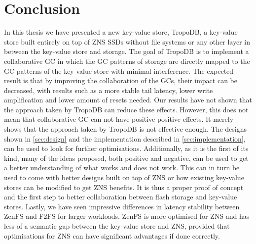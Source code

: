\chapter{Conclusion}
\label{sec:conclusion}
In this thesis we have presented a new key-value store, TropoDB, a key-value store built entirely on top of ZNS SSDs without file systems or any other layer in between the key-value store and storage. The goal of TropoDB is to implement a collaborative GC in which the GC patterns of storage are directly mapped to the GC patterns of the key-value store with minimal interference. The expected result is that by improving the collaboration of the GCs, their impact can be decreased, with results such as a more stable tail latency, lower write amplification and lower amount of resets needed. Our results have not shown that the approach taken by TropoDB can reduce these effects. However, this does not mean that collaborative GC can not have positive positive effects. It merely shows that the approach taken by TropoDB is not effective enough. The designs shown in \autoref{sec:design} and the implementation described in \autoref{sec:implementation}, can be used to look for further optimisations. Additionally, as it is the first of its kind, many of the ideas proposed, both positive and negative, can be used to get a better understanding of what works and does not work. This can in turn be used to come with better designs built on top of ZNS or how existing key-value stores can be modified to get ZNS benefits. It is thus a proper proof of concept and the first step to better collaboration between flash storage and key-value stores. Lastly, we have seen impressive differences in latency stability between ZenFS and F2FS for larger workloads. ZenFS is more optimised for ZNS and has less of a semantic gap between the key-value store and ZNS, provided that optimisations for ZNS can have significant advantages if done correctly.

